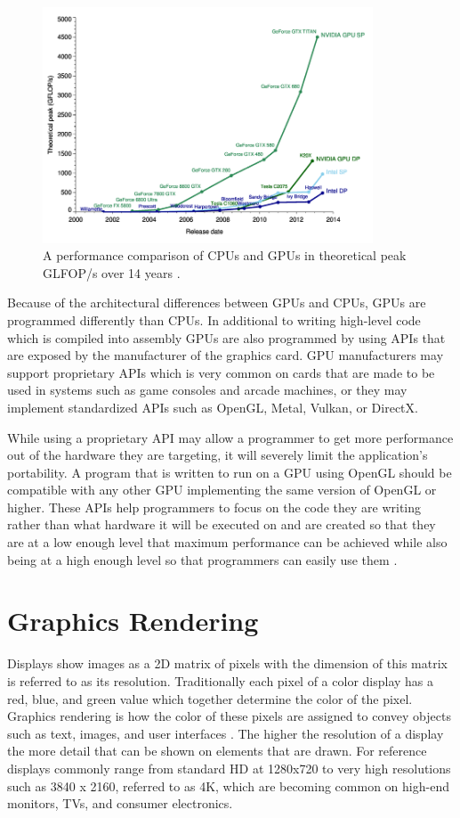 \documentclass{article}
\begin{document}
\begin{figure}[h]
	\centering
	\includegraphics[height=7cm]{cpu-vs-gpu}
	\caption{A performance comparison of CPUs and GPUs in theoretical peak GLFOP/s over 14 years \cite{galloy2013}.}
	\label{fig:performance}
\end{figure}

Because of the architectural differences between GPUs and CPUs, GPUs are programmed differently than CPUs. In additional to writing high-level code which is compiled into assembly GPUs are also programmed by using APIs that are exposed by the manufacturer of the graphics card. GPU manufacturers may support proprietary APIs which is very common on cards that are made to be used in systems such as game consoles and arcade machines, or they may implement standardized APIs such as OpenGL, Metal, Vulkan, or DirectX.

While using a proprietary API may allow a programmer to get more performance out of the hardware they are targeting, it will severely limit the application's portability. A program that is written to run on a GPU using OpenGL should be compatible with any other GPU implementing the same version of OpenGL or higher. These APIs help programmers to focus on the code they are writing rather than what hardware it will be executed on and are created so that they are at a low enough level that maximum performance can be achieved while also being at a high enough level so that programmers can easily use them \cite[p.~4]{sellers2016}.

\section{Graphics Rendering}
Displays show images as a 2D matrix of pixels with the dimension of this matrix is referred to as its resolution. Traditionally each pixel of a color display has a red, blue, and green value which together determine the color of the pixel. Graphics rendering is how the color of these pixels are assigned to convey objects such as text, images, and user interfaces \cite{mckesson2018}. The higher the resolution of a display the more detail that can be shown on elements that are drawn. For reference displays commonly range from standard HD at 1280x720 to very high resolutions such as 3840 x 2160, referred to as 4K, which are becoming common on high-end monitors, TVs, and consumer electronics.
\end{document}
